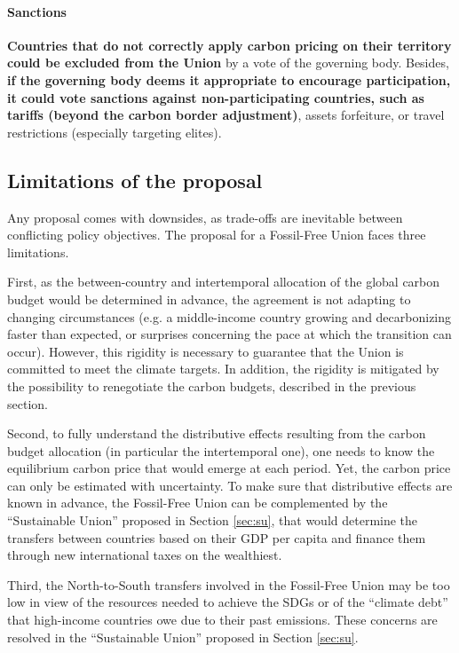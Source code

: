 \documentclass[12pt,english]{article}
\begin{document}
\paragraph{Sanctions}

\textbf{Countries that do not correctly apply carbon pricing on their territory could be excluded from the Union} by a vote of the governing body. 
Besides, \textbf{if the governing body deems it appropriate to encourage participation, it could vote sanctions against non-participating countries, such as tariffs (beyond the carbon border adjustment)}, assets forfeiture, or travel restrictions (especially targeting elites). 


\subsection{Limitations of the proposal\label{subsec:limitation}}

Any proposal comes with downsides, as trade-offs are inevitable between conflicting policy objectives. The proposal for a Fossil-Free Union faces three limitations. 

First, as the between-country and intertemporal allocation of the global carbon budget would be determined in advance, the agreement is not adapting to changing circumstances (e.g. a middle-income country growing and decarbonizing faster than expected, or surprises concerning the pace at which the transition can occur). However, this rigidity is necessary to guarantee that the Union is committed to meet the climate targets. In addition, the rigidity is mitigated by the possibility to renegotiate the carbon budgets, described in the previous section. 

Second, to fully understand the distributive effects resulting from the carbon budget allocation (in particular the intertemporal one), one needs to know the equilibrium carbon price that would emerge at each period. Yet, the carbon price can only be estimated with uncertainty. To make sure that distributive effects are known in advance, the Fossil-Free Union can be complemented by the ``Sustainable Union'' proposed in Section \ref{sec:su}, that would determine the transfers between countries based on their GDP per capita and finance them through new international taxes on the wealthiest.

Third, the North-to-South transfers involved in the Fossil-Free Union may be too low in view of the resources needed to achieve the SDGs or of the ``climate debt'' that high-income countries owe due to their past emissions. These concerns are resolved in the ``Sustainable Union'' proposed in Section \ref{sec:su}.
\end{document}
